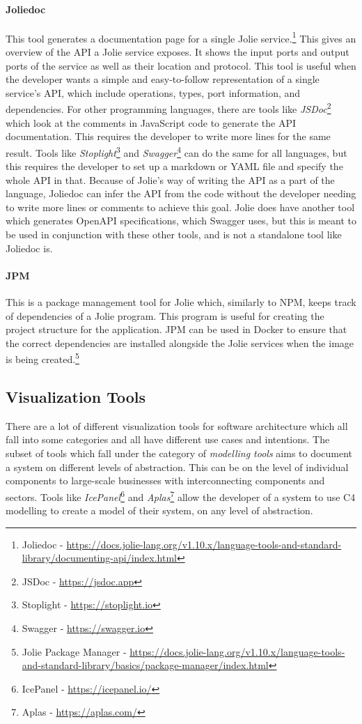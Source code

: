 \paragraph{Joliedoc} This tool generates a documentation page for a single Jolie service.\footnote{Joliedoc - \url{https://docs.jolie-lang.org/v1.10.x/language-tools-and-standard-library/documenting-api/index.html}} This gives an overview of the API a Jolie service exposes. It shows the input ports and output ports of the service as well as their location and protocol.
This tool is useful when the developer wants a simple and easy-to-follow representation of a single service's API, which include operations, types, port information, and dependencies.
For other programming languages, there are tools like \emph{JSDoc}\footnote{JSDoc - \url{https://jsdoc.app}} which look at the comments in JavaScript code to generate the API documentation. This requires the developer to write more lines for the same result.
Tools like \emph{Stoplight}\footnote{Stoplight - \url{https://stoplight.io}} and \emph{Swagger}\footnote{Swagger - \url{https://swagger.io}} can do the same for all languages, but this requires the developer to set up a markdown or YAML file and specify the whole API in that.
Because of Jolie's way of writing the API as a part of the language, Joliedoc can infer the API from the code without the developer needing to write more lines or comments to achieve this goal.
Jolie does have another tool which generates OpenAPI specifications, which Swagger uses, but this is meant to be used in conjunction with these other tools, and is not a standalone tool like Joliedoc is.

\paragraph{JPM} This is a package management tool for Jolie which, similarly to NPM, keeps track of dependencies of a Jolie program.
This program is useful for creating the project structure for the application. JPM can be used in Docker to ensure that the correct dependencies are installed alongside the Jolie services when the image is being created.\footnote{Jolie Package Manager - \url{https://docs.jolie-lang.org/v1.10.x/language-tools-and-standard-library/basics/package-manager/index.html}} 

\subsection{Visualization Tools}
There are a lot of different visualization tools for software architecture which all fall into some categories and all have different use cases and intentions.
The subset of tools which fall under the category of \emph{modelling tools} aims to document a system on different levels of abstraction. This can be on the level of individual components to large-scale businesses with interconnecting components and sectors.
Tools like \emph{IcePanel}\footnote{IcePanel - \url{https://icepanel.io/}} and \emph{Aplas}\footnote{Aplas - \url{https://aplas.com/}} allow the developer of a system to use C4 modelling to create a model of their system, on any level of abstraction.

